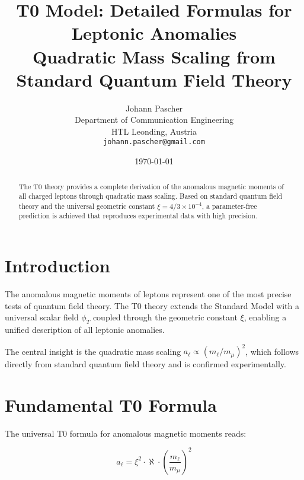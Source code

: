 \documentclass[12pt,a4paper]{article}
\begin{document}
	
	\title{T0 Model: Detailed Formulas for Leptonic Anomalies \\
		\large Quadratic Mass Scaling from Standard Quantum Field Theory}
	\author{Johann Pascher\\
		Department of Communication Engineering\\
		HTL Leonding, Austria\\
		\texttt{johann.pascher@gmail.com}}
	\date{\today}
	
	\maketitle
	
	\begin{abstract}
		The T0 theory provides a complete derivation of the anomalous magnetic moments of all charged leptons through quadratic mass scaling. Based on standard quantum field theory and the universal geometric constant $\xi = 4/3 \times 10^{-4}$, a parameter-free prediction is achieved that reproduces experimental data with high precision.
	\end{abstract}
	
	\tableofcontents
	\newpage
	
	\section{Introduction}
	
	The anomalous magnetic moments of leptons represent one of the most precise tests of quantum field theory. The T0 theory extends the Standard Model with a universal scalar field $\phi_T$ coupled through the geometric constant $\xi$, enabling a unified description of all leptonic anomalies.
	
	The central insight is the quadratic mass scaling $a_\ell \propto (m_\ell/m_\mu)^2$, which follows directly from standard quantum field theory and is confirmed experimentally.
	
	\section{Fundamental T0 Formula}
	
	The universal T0 formula for anomalous magnetic moments reads:
	
	\begin{equation}
		\boxed{a_\ell = \xi^2 \cdot \aleph \cdot \left(\frac{m_\ell}{m_\mu}\right)^2}
	\end{equation}
	
\end{document}
